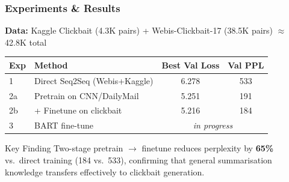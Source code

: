 \documentclass{beamer}
\begin{document}
\begin{frame}
\frametitle{Experiments \& Results}

\textbf{Data:} Kaggle Clickbait (4.3K pairs) + Webis-Clickbait-17 (38.5K pairs) $\approx$ \alert{42.8K total}

\vspace{0.2cm}

\begin{table}[h]
\centering
\small
\begin{tabular}{@{}llcc@{}}
\toprule
\textbf{Exp} & \textbf{Method} & \textbf{Best Val Loss} & \textbf{Val PPL} \\
\midrule
1 & Direct Seq2Seq (Webis+Kaggle) & 6.278 & 533 \\
2a & Pretrain on CNN/DailyMail     & 5.251 & 191 \\
2b & + Finetune on clickbait       & \alert{5.216} & \alert{184} \\
3 & BART fine-tune                 & \multicolumn{2}{c}{\textit{in progress}} \\
\bottomrule
\end{tabular}
\end{table}

\vspace{0.15cm}

\begin{alertblock}{Key Finding}
Two-stage pretrain $\rightarrow$ finetune reduces perplexity by \textbf{65\%} vs.\ direct training (184 vs.\ 533), confirming that general summarisation knowledge transfers effectively to clickbait generation.
\end{alertblock}

\end{frame}
\end{document}
